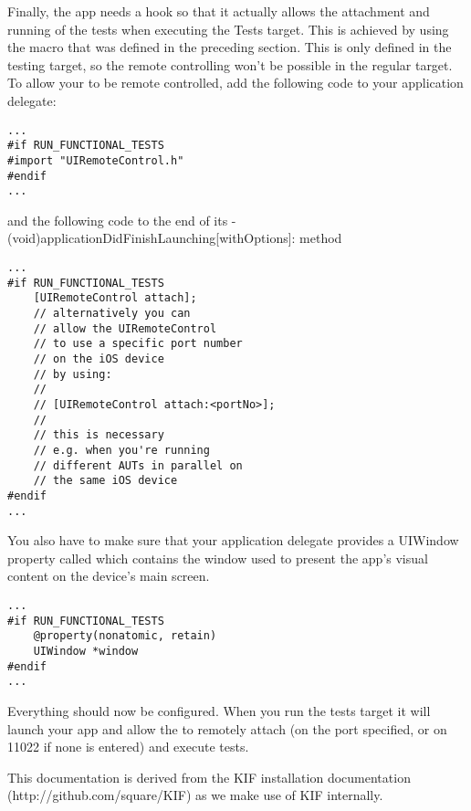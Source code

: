 Finally, the app needs a hook so that it actually allows the attachment and running of the tests when executing the Tests target. 
This is achieved by using the   macro that was defined in the preceding section. This  is only defined in 
the testing target, so the remote controlling won't be possible in the regular target. To allow your \gdaut{} to be remote controlled, add the 
following code to your application delegate:

\begin{verbatim}
...
#if RUN_FUNCTIONAL_TESTS
#import "UIRemoteControl.h"
#endif
...
\end{verbatim}

and the following code to the end of its - (void)applicationDidFinishLaunching[withOptions]: method

\begin{verbatim}
...
#if RUN_FUNCTIONAL_TESTS
    [UIRemoteControl attach];
    // alternatively you can
    // allow the UIRemoteControl 
    // to use a specific port number 
    // on the iOS device 
    // by using:
    // 
    // [UIRemoteControl attach:<portNo>];
    // 
    // this is necessary
    // e.g. when you're running 
    // different AUTs in parallel on 
    // the same iOS device
#endif
...
\end{verbatim}

You also have to make sure that your application delegate provides a UIWindow property called  which contains the window used to present the app's visual content on the device's main screen.

\begin{verbatim}
...
#if RUN_FUNCTIONAL_TESTS
    @property(nonatomic, retain) 
    UIWindow *window
#endif
...
\end{verbatim}

Everything should now be configured. When you run the \gdaut{} tests target it will launch your app and allow the \ite{} to remotely attach (on the port specified, or on 11022 if none is entered) and execute tests.


This documentation is derived from the KIF installation documentation (http://github.com/square/KIF) as we make use of KIF internally.
